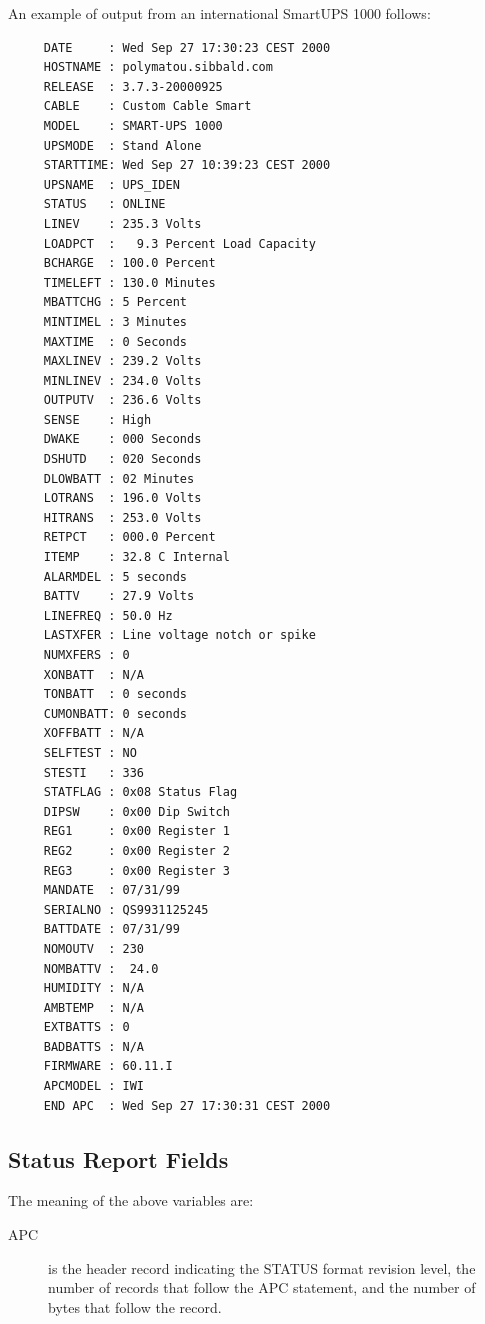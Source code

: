{{{{{{{{{{{\label{index-Examples_002c-Status-Report-254}
\label{index-Status-255}
An example of output from an international SmartUPS 1000 follows: 

\footnotesize
\begin{verbatim}
     DATE     : Wed Sep 27 17:30:23 CEST 2000
     HOSTNAME : polymatou.sibbald.com
     RELEASE  : 3.7.3-20000925
     CABLE    : Custom Cable Smart
     MODEL    : SMART-UPS 1000
     UPSMODE  : Stand Alone
     STARTTIME: Wed Sep 27 10:39:23 CEST 2000
     UPSNAME  : UPS_IDEN
     STATUS   : ONLINE
     LINEV    : 235.3 Volts
     LOADPCT  :   9.3 Percent Load Capacity
     BCHARGE  : 100.0 Percent
     TIMELEFT : 130.0 Minutes
     MBATTCHG : 5 Percent
     MINTIMEL : 3 Minutes
     MAXTIME  : 0 Seconds
     MAXLINEV : 239.2 Volts
     MINLINEV : 234.0 Volts
     OUTPUTV  : 236.6 Volts
     SENSE    : High
     DWAKE    : 000 Seconds
     DSHUTD   : 020 Seconds
     DLOWBATT : 02 Minutes
     LOTRANS  : 196.0 Volts
     HITRANS  : 253.0 Volts
     RETPCT   : 000.0 Percent
     ITEMP    : 32.8 C Internal
     ALARMDEL : 5 seconds
     BATTV    : 27.9 Volts
     LINEFREQ : 50.0 Hz
     LASTXFER : Line voltage notch or spike
     NUMXFERS : 0
     XONBATT  : N/A
     TONBATT  : 0 seconds
     CUMONBATT: 0 seconds
     XOFFBATT : N/A
     SELFTEST : NO
     STESTI   : 336
     STATFLAG : 0x08 Status Flag
     DIPSW    : 0x00 Dip Switch
     REG1     : 0x00 Register 1
     REG2     : 0x00 Register 2
     REG3     : 0x00 Register 3
     MANDATE  : 07/31/99
     SERIALNO : QS9931125245
     BATTDATE : 07/31/99
     NOMOUTV  : 230
     NOMBATTV :  24.0
     HUMIDITY : N/A
     AMBTEMP  : N/A
     EXTBATTS : 0
     BADBATTS : N/A
     FIRMWARE : 60.11.I
     APCMODEL : IWI
     END APC  : Wed Sep 27 17:30:31 CEST 2000
\end{verbatim}
\normalsize

\label{Status-Report-Fields}

\subsection*{Status Report Fields}

\label{index-Status-256}
The meaning of the above variables are:  

\begin{description}

\item [APC]
   is the header record indicating the STATUS format revision level, the number
of records that follow the APC statement, and the number of bytes that follow
the record.  


\end{description}}}}}}}}}}}}
